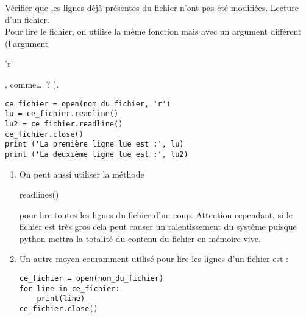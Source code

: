 \begin{enonce}
	Vérifier que les lignes déjà présentes du fichier n'ont pas été modifiées.
	\pagebreak
	\ques Lecture d'un fichier. \\

	Pour lire le fichier, on utilise la même fonction mais avec un argument différent (l'argument \begin{texttt}'r'\end{texttt}, comme\dots ? ).

	\begin{verbatim}
ce_fichier = open(nom_du_fichier, 'r') 
lu = ce_fichier.readline()
lu2 = ce_fichier.readline()
ce_fichier.close()
print ('La première ligne lue est :', lu)
print ('La deuxième ligne lue est :', lu2)

\end{verbatim}


	 \begin{enumerate}
		\item On peut aussi utiliser la méthode \begin{texttt}readlines()\end{texttt} pour lire toutes les lignes du fichier d'un coup. Attention cependant, si le fichier est très gros cela peut causer un ralentissement du système puisque python mettra la totalité du contenu du fichier en mémoire vive.
		\item Un autre moyen couramment utilisé pour lire les lignes d'un fichier est :
		      \begin{verbatim}ce_fichier = open(nom_du_fichier)
for line in ce_fichier:
	print(line)
ce_fichier.close()
\end{verbatim}
	\end{enumerate}
\end{enonce}

\begin{correction}

\end{correction}



